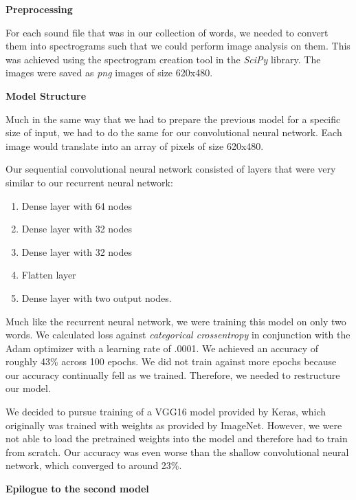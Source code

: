 \documentclass[12pt,journal,compsoc]{IEEEtran}
\begin{document}
\begin{center}
	\textbf{Preprocessing}
\end{center}

For each sound file that was in our collection of words, we needed to convert them into spectrograms such that we could perform image analysis on them. This was achieved using the spectrogram creation tool in the \textit{SciPy} library. The images were saved as \textit{png} images of size 620x480. 

\begin{center}
	\textbf{Model Structure}
\end{center}

Much in the same way that we had to prepare the previous model for a specific size of input, we had to do the same for our convolutional neural network. Each image would translate into an array of pixels of size 620x480. 

Our sequential convolutional neural network consisted of layers that were very similar to our recurrent neural network:

\begin{enumerate}
	\item Dense layer with 64 nodes
	\item	Dense layer with 32 nodes
	\item Dense layer with 32 nodes
	\item Flatten layer
	\item Dense layer with two output nodes. 
\end{enumerate}

Much like the recurrent neural network, we were training this model on only two words. We calculated loss against \textit{categorical crossentropy} in conjunction with the Adam optimizer with a learning rate of .0001. We achieved an accuracy of roughly 43\% across 100 epochs. We did not train against more epochs because our accuracy continually fell as we trained. Therefore, we needed to restructure our model. 

We decided to pursue training of a VGG16 model provided by Keras, which originally was trained with weights as provided by ImageNet. However, we were not able to load the pretrained weights into the model and therefore had to train from scratch. Our accuracy was even worse than the shallow convolutional neural network, which converged to around 23\%. 

\begin{center}
	\textbf{Epilogue to the second model}
\end{center}
\end{document}
